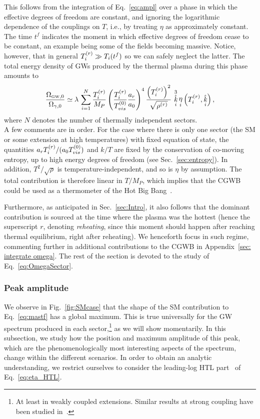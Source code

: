 \documentclass[a4paper,11pt]{article}
\DeclareMathOperator{\heta}{\eta}
\DeclareMathOperator{\hk}{\hat{\mathit{k}}}
\newcommand{\tem}[2]{T_{\tiny{#1}}^{(#2)}}
\begin{document}
This follows from the integration of Eq.~\eqref{eq:ampl} over a phase in which the effective degrees of freedom are constant, and ignoring the logarithmic dependence of the couplings on $T$,
i.e., by treating $\eta$ as approximately constant.
The time $t^f$ indicates the moment in which effective degrees of freedom cease to be constant, an example being some of the fields becoming massive. 
Notice, however, that in general $\tem{i}{r}\gg T_i(t^f)$ so we can safely neglect the latter.
The total energy density of GWs produced by the thermal plasma during this phase amounts to
\begin{align}\label{eq:mastf}
\dfrac{ \Omega_{\text{\tiny{GW}},0}}{\Omega_{\gamma,0} } \simeq \lambda\,
    \sum_{i=1}^{N}{ \frac{\tem{i}{r}}{M_{P}}  \left (\frac{\tem{i}{r}}{\tem{vis}{0}}\frac{a_{r}}{a_0}\right)^4
     \dfrac{\left (\tem{i}{r}\right )^{2}}{\sqrt{\rho^{(r)}}} \, \hk_i^3 \heta_i \left (\tem{i}{r},\hk_i \right )} \,,
\end{align}
where $N$ denotes the number of thermally independent sectors.\\
A few comments are in order.
For the case where there is only one sector (the SM or some extension at high temperatures) with fixed equation of state, the quantities $a_r\tem{i}{r}/(a_0\tem{vis}{0})$ and $k/T$ are fixed by the conservation of co-moving entropy, up to high energy degrees of freedom (see Sec.~\ref{sec:entropy}). 
In addition, $T^2/\sqrt\rho$ is temperature-independent, and so is $\eta$ by assumption.
The total contribution is therefore linear in ${T}/{M_{P}}$, which implies that the CGWB could be used as a thermometer of the Hot Big Bang~\cite{Ringwald:2020ist}. 

Furthermore, as anticipated in Sec.~\ref{sec:Intro}, it also follows that the dominant contribution is sourced at the time where the plasma was the hottest (hence the superscript $r$, denoting \textit{reheating}, since this moment should happen after reaching thermal equilibrium, right after reheating).
We henceforth focus in such regime, commenting further in additional contributions to the CGWB in Appendix~\ref{sec: integrate omega}.
The rest of the section is devoted to the study of Eq.~\eqref{eq:OmegaSector}.


\subsubsection{Peak amplitude}

We observe in Fig.~\ref{fig:SMcase} that the shape of the SM contribution to Eq.~\eqref{eq:mastf} has a global maximum. This is true universally for the GW spectrum produced in each sector,\footnote{At least in weakly coupled extensions. Similar results at strong coupling have been studied in~\cite{Castells-Tiestos:2022qgu}.} as we will show momentarily.
In this subsection,
we study how the position and maximum amplitude of this peak, which are the phenomenologically most interesting aspects of the spectrum, change within the different scenarios.
In order to obtain an analytic understanding, we restrict ourselves to consider the leading-log HTL part~\cite{Ghiglieri:2015nfa,Ghiglieri:2020mhm,Ringwald:2020ist}
of Eq.~\eqref{eq:eta_HTL}.\\
\end{document}
